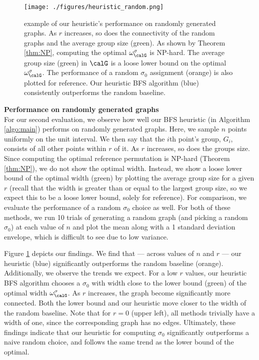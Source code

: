 

\begin{figure}[h]
    \centering
    \texttt{[image: ./figures/heuristic\_random.png]}
    \caption{example of our heuristic's performance on randomly generated graphs. As $r$ increases, so does the connectivity of the random graphs and the average group size (green). As shown by Theorem \ref{thm:NP}, computing the optimal $\omega_\calG^\sigma$ is NP-hard. The average group size (green) in $\calG$ is a loose lower bound on the optimal $\omega_\calG^\sigma$. The performance of a random $\sigma_0$ assignment (orange) is also plotted for reference. Our heuristic BFS algorithm (blue) consistently outperforms the random baseline.}
    \label{fig:heuristic random}
\end{figure}

\textbf{Performance on randomly generated graphs}\\
For our second evaluation, we observe how well our BFS heuristic (in Algorithm \ref{algo:main}) performs on randomly generated graphs. Here, we sample $n$ points uniformly on the unit interval. We then say that the $i$th point's group, $G_i$, consists of all other points within $r$ of it. As $r$ increases, so does the groups size. Since computing the optimal reference permutation is NP-hard (Theorem \ref{thm:NP}), we do not show the optimal width. Instead, we show a loose lower bound of the optimal width (green) by plotting the average group size for a given $r$ (recall that the width is greater than or equal to the largest group size, so we expect this to be a loose lower bound, solely for reference). For comparison, we evaluate the performance of a random $\sigma_0$ choice as well. For both of these methods, we run 10 trials of generating a random graph (and picking a random $\sigma_0$) at each value of $n$ and plot the mean along with a 1 standard deviation envelope, which is difficult to see due to low variance. 

Figure \ref{fig:heuristic random} depicts our findings. We find that --- across values of $n$ and $r$ --- our heuristic (blue) significantly outperforms the random baseline (orange). Additionally, we observe the trends we expect. For a low $r$ values, our heuristic BFS algorithm chooses a $\sigma_0$ with width close to the lower bound (green) of the optimal width $\omega_{\calG}^\sigma$. As $r$ increases, the graph become significantly more connected. Both the lower bound and our heuristic move closer to the width of the random baseline. Note that for $r = 0$ (upper left), all methods trivially have a width of one, since the corresponding graph has no edges. Ultimately, these findings indicate that our heuristic for computing $\sigma_0$ significantly outperforms a naive random choice, and follows the same trend as the lower bound of the optimal. 